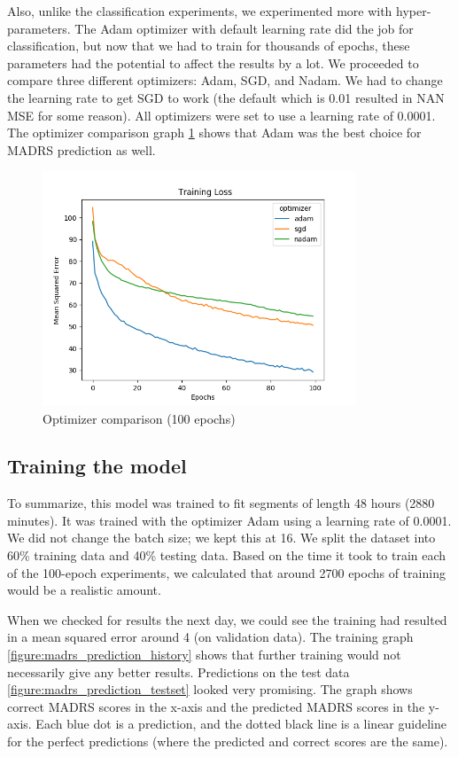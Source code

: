 Also, unlike the classification experiments, we experimented more with hyper-parameters. The Adam optimizer with default learning rate did the job for classification, 
but now that we had to train for thousands of epochs, these parameters had the potential to affect the results by a lot. 
We proceeded to compare three different optimizers: Adam, SGD, and Nadam. We had to change the learning rate to get SGD to work 
(the default which is 0.01 \cite{keras_docs_optimizers} resulted in NAN MSE for some reason). All optimizers were set to use a learning rate of 0.0001. 
The optimizer comparison graph \ref{figure:madrs_prediction_optimizers} shows that Adam was the best choice for MADRS prediction as well. 

\begin{figure}
\begin{center}
      \includegraphics[height=7cm]{img/madrs_prediction/optimizers.png}
      \caption{Optimizer comparison (100 epochs)}
      \label{figure:madrs_prediction_optimizers}
\end{center}
\end{figure}

\subsection{Training the model}
To summarize, this model was trained to fit segments of length 48 hours (2880 minutes). It was trained with the optimizer Adam using a learning rate of 0.0001. We did not change the batch size; we kept this at 16. We split the dataset into 60\% training data and 40\% testing data. Based on the time it took to train each of the 100-epoch experiments, we calculated that around 2700 epochs of training would be a realistic amount.

When we checked for results the next day, we could see the training had resulted in a mean squared error around 4 (on validation data). The training graph \ref{figure:madrs_prediction_history} shows that further training would not necessarily give any better results. Predictions on the test data \ref{figure:madrs_prediction_testset} looked very promising. The graph shows correct MADRS scores in the x-axis and the predicted MADRS scores in the y-axis. Each blue dot is a prediction, and the dotted black line is a linear guideline for the perfect predictions (where the predicted and correct scores are the same). 

